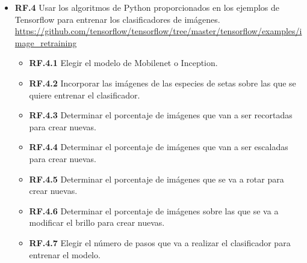 \begin{itemize}
	\item \textbf{RF.4} Usar los algoritmos de Python proporcionados en los ejemplos de Tensorflow para entrenar los clasificadores de imágenes. \url{https://github.com/tensorflow/tensorflow/tree/master/tensorflow/examples/image_retraining}
	\begin{itemize}
	\item \textbf{RF.4.1} Elegir el modelo de Mobilenet o Inception.
	\item \textbf{RF.4.2} Incorporar las imágenes de las especies de setas sobre las que se quiere entrenar el clasificador.
	\item \textbf{RF.4.3} Determinar el porcentaje de imágenes que van a ser recortadas para crear nuevas.
	\item \textbf{RF.4.4} Determinar el porcentaje de imágenes que van a ser escaladas para crear nuevas.
	\item \textbf{RF.4.5} Determinar el porcentaje de imágenes que se va a rotar para crear nuevas.
	\item \textbf{RF.4.6} Determinar el porcentaje de imágenes sobre las que se va a modificar el brillo para crear nuevas.
	\item \textbf{RF.4.7} Elegir el número de pasos que va a realizar el clasificador para entrenar el modelo.
	\end{itemize}
	

\end{itemize}
